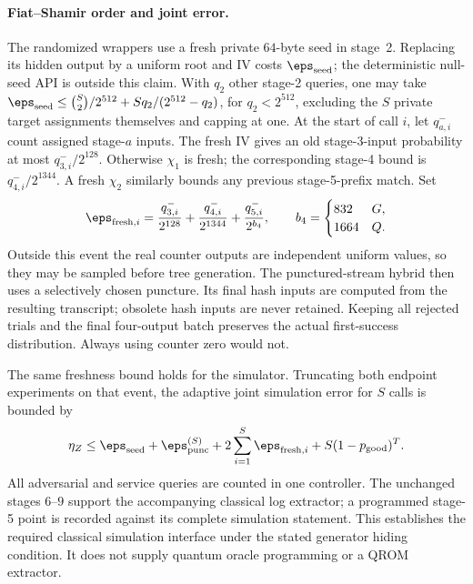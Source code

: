 \paragraph{Fiat--Shamir order and joint error.}
The randomized wrappers use a fresh private $64$-byte seed in stage~2.
Replacing its hidden output by a uniform root and IV costs $\eps_{\rm seed}$;
the deterministic null-seed API is outside this claim.  With $q_2$ other
stage-2 queries, one may take
$\eps_{\rm seed}\le\binom S2/2^{512}+S q_2/(2^{512}-q_2)$,
for $q_2<2^{512}$, excluding the $S$ private target assignments themselves and capping at one.
At the start of call
$i$, let $q_{a,i}^{-}$ count assigned stage-$a$ inputs.  The fresh IV gives
an old stage-3-input probability at most $q_{3,i}^{-}/2^{128}$.  Otherwise
$\chi_1$ is fresh; the corresponding stage-4 bound is
$q_{4,i}^{-}/2^{1344}$.  A fresh $\chi_2$ similarly bounds any previous
stage-5-prefix match.  Set
\[
 \eps_{{\rm fresh},i}=
 \frac{q_{3,i}^{-}}{2^{128}}+
 \frac{q_{4,i}^{-}}{2^{1344}}+
 \frac{q_{5,i}^{-}}{2^{b_4}},\qquad
 b_4=\begin{cases}832&G,\\1664&Q.\end{cases}
\]
Outside this event the real counter outputs are independent uniform values,
so they may be sampled before tree generation.  The punctured-stream hybrid
then uses a selectively chosen puncture.  Its final hash inputs are computed
from the resulting transcript; obsolete hash inputs are never retained.
Keeping all rejected trials and the final four-output batch preserves the
actual first-success distribution.  Always using counter zero would not.

The same freshness bound holds for the simulator.  Truncating both endpoint
experiments on that event, the adaptive joint simulation error for $S$ calls
is bounded by
\[
 \eta_Z\le\eps_{\rm seed}+\eps_{\rm punc}^{(S)}
       +2\sum_{i=1}^S\eps_{{\rm fresh},i}
       +S(1-p_{\rm good})^T.
\]
All adversarial and service queries are counted in one controller.  The
unchanged stages $6$--$9$ support the accompanying classical log extractor;
a programmed stage-5 point is recorded against its complete simulation
statement.  This establishes the required classical simulation interface
under the stated generator hiding condition.  It does not supply quantum
oracle programming or a QROM extractor.
